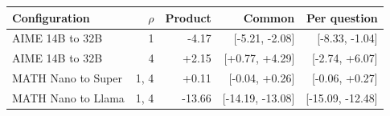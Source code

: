 \begin{tabular}{lrrrr}
\toprule
Configuration & $\rho$ & Product & Common & Per question \\
\midrule
AIME 14B to 32B & 1 & -4.17 & [-5.21, -2.08] & [-8.33, -1.04] \\
AIME 14B to 32B & 4 & +2.15 & [+0.77, +4.29] & [-2.74, +6.07] \\
MATH Nano to Super & 1, 4 & +0.11 & [-0.04, +0.26] & [-0.06, +0.27] \\
MATH Nano to Llama & 1, 4 & -13.66 & [-14.19, -13.08] & [-15.09, -12.48] \\
\bottomrule
\end{tabular}
